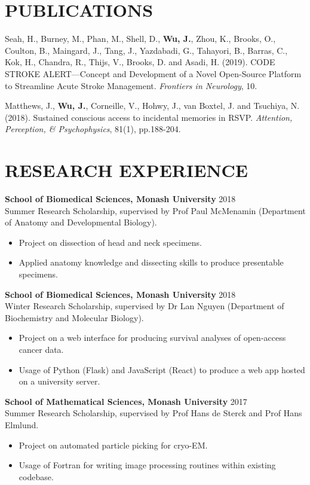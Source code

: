 \documentclass[margin]{res}
\begin{document}
\begin{resume}
  \section{PUBLICATIONS}

    Seah, H., Burney, M., Phan, M., Shell, D., {\bf Wu, J.}, Zhou, K., Brooks, O., Coulton, B., Maingard, J., Tang, J., Yazdabadi, G., Tahayori, B., Barras, C., Kok, H., Chandra, R., Thijs, V., Brooks, D. and Asadi, H. (2019). CODE STROKE ALERT—Concept and Development of a Novel Open-Source Platform to Streamline Acute Stroke Management. {\it Frontiers in Neurology}, 10.

    Matthews, J., {\bf Wu, J.}, Corneille, V., Hohwy, J., van Boxtel, J. and Tsuchiya, N. (2018). Sustained conscious access to incidental memories in RSVP. {\it Attention, Perception, \& Psychophysics}, 81(1), pp.188-204. \\


  \section{RESEARCH EXPERIENCE}

{\bf School of Biomedical Sciences, Monash University} \hfill 2018\\
  Summer Research Scholarship, supervised by Prof Paul McMenamin (Department of
  Anatomy and Developmental Biology).
  \begin{itemize} \itemsep -2pt
      \item Project on dissection of head and neck specimens.
      \item Applied anatomy knowledge and dissecting skills to produce
        presentable specimens.
  \end{itemize}

  {\bf School of Biomedical Sciences, Monash University} \hfill 2018\\
  Winter Research Scholarship, supervised by Dr Lan Nguyen (Department of
  Biochemistry and Molecular Biology).
  \begin{itemize} \itemsep -2pt
      \item Project on a web interface for producing survival analyses of
        open-access cancer data.
      \item Usage of Python (Flask) and JavaScript (React) to produce a web app
        hosted on a university server.
  \end{itemize}

  {\bf School of Mathematical Sciences, Monash University} \hfill 2017\\
  Summer Research Scholarship, supervised by Prof Hans de Sterck and Prof Hans
  Elmlund.
  \begin{itemize} \itemsep -2pt
      \item Project on automated particle picking for cryo-EM.
      \item Usage of Fortran for writing image processing routines within
          existing codebase.
  \end{itemize}


\end{resume}
\end{document}
